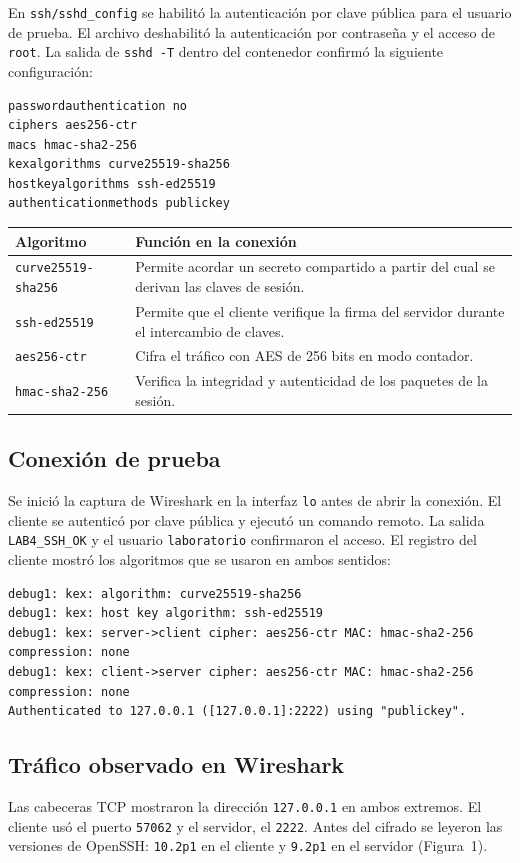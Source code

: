 \documentclass[letterpaper,11pt]{article}
\begin{document}
En \texttt{ssh/sshd\_config} se habilitó la autenticación por clave pública para el usuario de prueba. El archivo deshabilitó la autenticación por contraseña y el acceso de \texttt{root}. La salida de \texttt{sshd -T} dentro del contenedor confirmó la siguiente configuración:
\begin{Verbatim}[fontsize=\small]
passwordauthentication no
ciphers aes256-ctr
macs hmac-sha2-256
kexalgorithms curve25519-sha256
hostkeyalgorithms ssh-ed25519
authenticationmethods publickey
\end{Verbatim}

\begin{tabularx}{\linewidth}{@{}lX@{}}
\toprule
\textbf{Algoritmo} & \textbf{Función en la conexión}\tabularnewline
\midrule
\texttt{curve25519-sha256} & Permite acordar un secreto compartido a partir del cual se derivan las claves de sesión.\tabularnewline
\texttt{ssh-ed25519} & Permite que el cliente verifique la firma del servidor durante el intercambio de claves.\tabularnewline
\texttt{aes256-ctr} & Cifra el tráfico con AES de 256 bits en modo contador.\tabularnewline
\texttt{hmac-sha2-256} & Verifica la integridad y autenticidad de los paquetes de la sesión.\tabularnewline
\bottomrule
\end{tabularx}

\subsection{Conexión de prueba}
Se inició la captura de Wireshark en la interfaz \texttt{lo} antes de abrir la conexión. El cliente se autenticó por clave pública y ejecutó un comando remoto. La salida \texttt{LAB4\_SSH\_OK} y el usuario \texttt{laboratorio} confirmaron el acceso. El registro del cliente mostró los algoritmos que se usaron en ambos sentidos:
\begin{Verbatim}[fontsize=\footnotesize,breaklines]
debug1: kex: algorithm: curve25519-sha256
debug1: kex: host key algorithm: ssh-ed25519
debug1: kex: server->client cipher: aes256-ctr MAC: hmac-sha2-256 compression: none
debug1: kex: client->server cipher: aes256-ctr MAC: hmac-sha2-256 compression: none
Authenticated to 127.0.0.1 ([127.0.0.1]:2222) using "publickey".
\end{Verbatim}

\clearpage
\subsection{Tráfico observado en Wireshark}
Las cabeceras TCP mostraron la dirección \texttt{127.0.0.1} en ambos extremos. El cliente usó el puerto \texttt{57062} y el servidor, el \texttt{2222}. Antes del cifrado se leyeron las versiones de OpenSSH: \texttt{10.2p1} en el cliente y \texttt{9.2p1} en el servidor (Figura~1).
\end{document}
